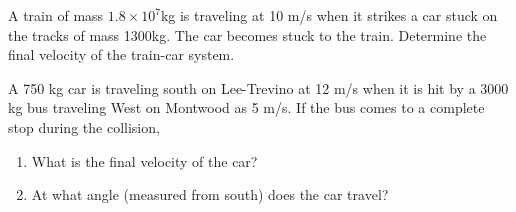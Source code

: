 \documentclass[10pt]{examdesign}
\begin{document}
\begin{shortanswer}[title={Free Response}, rearrange=no]
	\begin{question} 
A train of mass $1.8\times10^7$kg is traveling at 10 m/s when it strikes a car stuck on the tracks of mass 1300kg. The car becomes stuck to the train.  Determine the final velocity of the train-car system. 
\vspace{1.5 in}
	\end{question}



\begin{question}
A 750 kg car is traveling south on Lee-Trevino at 12 m/s when it is hit by a 3000 kg bus traveling West on Montwood as 5 m/s.  If the bus comes to a complete stop during the collision,
\begin{enumerate}
	\item What is the final velocity of the car?
	\vspace{1in}
	\item At what angle (measured from south) does the car travel?  
\end{enumerate}


\end{question}

	
\end{shortanswer}
\end{document}
